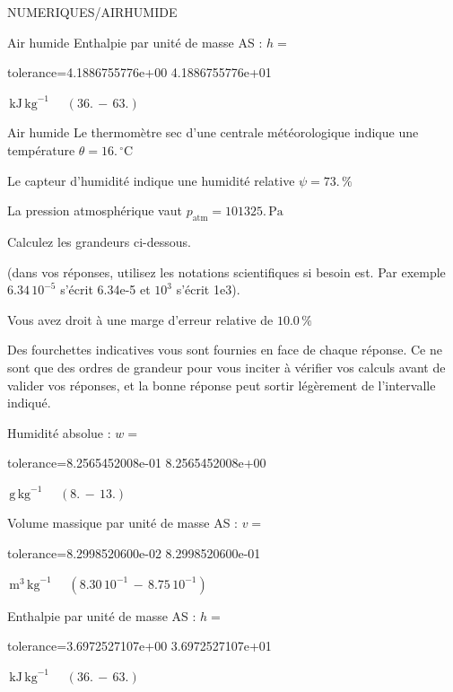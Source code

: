 \documentclass[12pt]{article}
\begin{document}
\begin{quiz}{NUMERIQUES/AIRHUMIDE}
\begin{cloze}{Air humide}
Enthalpie par unité de masse AS : $h =  $
\begin{numerical}[points=2] 
\item[tolerance={4.1886755776e+00}] 4.1886755776e+01 
\end{numerical} 
 $\,  \mathrm{kJ}\,  \mathrm{kg}^{-1}$ 
 $ \quad (36. \, - \, 63.) $ 

\end{cloze} 


 \begin{cloze}{Air humide} 
Le thermomètre sec d’une centrale météorologique indique une température $\theta = 16.\,  \mathrm{^\circ\mathrm{C}} $

Le capteur d'humidité indique une humidité relative $\psi = 73.\, \% $

La pression atmosphérique vaut $p_{\text{atm}} = 101325.\,  \mathrm{Pa} $

 

Calculez les grandeurs ci-dessous.

(dans vos réponses, utilisez les notations scientifiques si besoin est. Par exemple $6.34\, 10^{-5}$ s'écrit 6.34e-5 et $10^{3}$ s'écrit 1e3).

Vous avez droit à une marge d'erreur relative de $10.0\, \% $

Des fourchettes indicatives vous sont fournies en face de chaque réponse. Ce ne sont que des ordres de grandeur pour vous inciter à vérifier vos calculs avant de valider vos réponses, et la bonne réponse peut sortir légèrement de l'intervalle indiqué.

Humidité absolue : $w =  $
\begin{numerical}[points=1] 
\item[tolerance={8.2565452008e-01}] 8.2565452008e+00 
\end{numerical} 
 $\,  \mathrm{g}\,  \mathrm{kg}^{-1}$ 
 $ \quad (8. \, - \, 13.) $ 

Volume massique par unité de masse AS : $v =  $
\begin{numerical}[points=1] 
\item[tolerance={8.2998520600e-02}] 8.2998520600e-01 
\end{numerical} 
 $\,  \mathrm{m}^{3}\,  \mathrm{kg}^{-1}$ 
 $ \quad ( 8.30 \, 10^{-1}  \, - \,  8.75 \, 10^{-1} ) $ 

Enthalpie par unité de masse AS : $h =  $
\begin{numerical}[points=2] 
\item[tolerance={3.6972527107e+00}] 3.6972527107e+01 
\end{numerical} 
 $\,  \mathrm{kJ}\,  \mathrm{kg}^{-1}$ 
 $ \quad (36. \, - \, 63.) $ 


\end{cloze}
\end{quiz}
\end{document}
